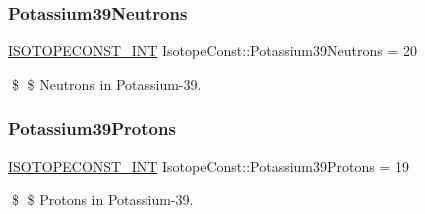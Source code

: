 \subsubsection{\texorpdfstring{Potassium39\+Neutrons}{Potassium39Neutrons}}
{\footnotesize\ttfamily \mbox{\hyperlink{group___isotope_const-_macros_ga5f18360b3e99483a35c32d789e62621c}{I\+S\+O\+T\+O\+P\+E\+C\+O\+N\+S\+T\+\_\+\+I\+NT}} Isotope\+Const\+::\+Potassium39\+Neutrons = 20}

\$ \$ Neutrons in Potassium-\/39. \mbox{\label{group___isotope_const-_potassium-_k39_gaede42f9f4cb8d7b0cf20090b25bd839b}} 
\subsubsection{\texorpdfstring{Potassium39\+Protons}{Potassium39Protons}}
{\footnotesize\ttfamily \mbox{\hyperlink{group___isotope_const-_macros_ga5f18360b3e99483a35c32d789e62621c}{I\+S\+O\+T\+O\+P\+E\+C\+O\+N\+S\+T\+\_\+\+I\+NT}} Isotope\+Const\+::\+Potassium39\+Protons = 19}

\$ \$ Protons in Potassium-\/39. 